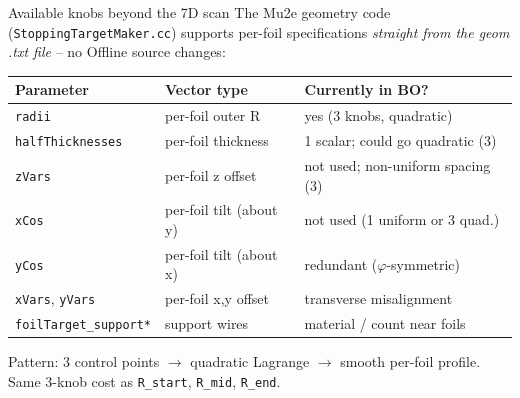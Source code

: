 \documentclass[10pt,aspectratio=169]{beamer}
\begin{document}
\begin{frame}{Available knobs beyond the 7D scan}
The Mu2e geometry code (\texttt{StoppingTargetMaker.cc}) supports per-foil specifications
\emph{straight from the geom .txt file} -- no Offline source changes:

\medskip
{\footnotesize
\begin{tabular}{lll}
\toprule
Parameter & Vector type & Currently in BO? \\
\midrule
\texttt{radii} & per-foil outer R & yes (3 knobs, quadratic) \\
\texttt{halfThicknesses} & per-foil thickness & 1 scalar; could go quadratic (3) \\
\texttt{zVars} & per-foil z offset & not used; non-uniform spacing (3) \\
\texttt{xCos} & per-foil tilt (about y) & not used (1 uniform or 3 quad.) \\
\texttt{yCos} & per-foil tilt (about x) & redundant ($\varphi$-symmetric) \\
\texttt{xVars}, \texttt{yVars} & per-foil x,y offset & transverse misalignment \\
\texttt{foilTarget\_support*} & support wires & material / count near foils \\
\bottomrule
\end{tabular}
}

\medskip
Pattern: 3 control points $\to$ quadratic Lagrange $\to$ smooth per-foil profile.
Same 3-knob cost as \texttt{R\_start}, \texttt{R\_mid}, \texttt{R\_end}.
\end{frame}
\end{document}
